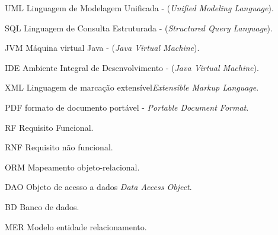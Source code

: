 \begin{siglas}
	\item[UML]  Linguagem de Modelagem Unificada - (\textit{Unified Modeling Language}).
	\item[SQL]  Linguagem de Consulta Estruturada - (\textit{Structured Query Language}).
	\item[JVM]  Máquina virtual Java - (\textit{Java Virtual Machine}).
	\item[IDE]  Ambiente Integral de Desenvolvimento - (\textit{Java Virtual Machine}).
	\item[XML]  Linguagem de marcação extensível\textit{Extensible Markup Language}.
	\item[PDF]  formato de documento portável - \textit{Portable Document Format}.
	\item[RF]  Requisito Funcional.
	\item[RNF]  Requisito não funcional.
	\item[ORM]  Mapeamento objeto-relacional.
	\item[DAO] Objeto de acesso a dados \textit{Data Access Object}.
	\item[BD]  Banco de dados.
	\item[MER]  Modelo entidade relacionamento.
\end{siglas}

